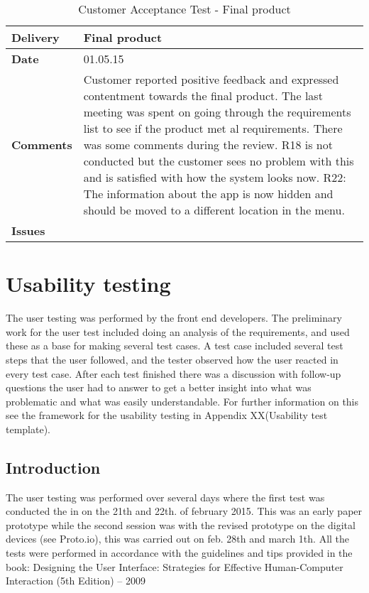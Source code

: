\begin{center}
\begin{longtable}{ | p{4cm} | p{13cm} | }
					
					
				\end{longtable}
			\end{center}
			
			\renewcommand{\arraystretch}{2}%
			\begin{center}
				\begin{longtable}{ | p{4cm} | p{13cm} | }
					
					\caption[Customer Acceptance Test - Final product]{Customer Acceptance Test - Final product} \label{Tab:cattest5}\\
					\hline
					\textbf{Delivery} & Final product\\ \hline
					\textbf{Date} & 01.05.15 \\ \hline
					\textbf{Comments} & Customer reported positive feedback and expressed contentment towards the final product.  The last meeting was spent on going through the requirements list to see if the product met al requirements. There was some comments during the review. 
					R18 is not conducted but the customer sees no problem with this and is satisfied with how the system looks now. 
					R22: The information about the app is now hidden and should be moved to a different location in the menu.   \\ \hline
					\textbf{Issues} \\ \hline
				\end{longtable}
			\end{center}
			
			\section{Usability testing}
			
			The user testing was performed by the front end developers. The preliminary work for the user test included doing an analysis of the requirements, and used these as a base for making several test cases. 
			A test case included several test steps that the user followed, and the tester observed how the user reacted in every test case. After each test finished there was a discussion with follow-up questions the user had to answer to get a better insight into what was problematic and what was easily understandable. For further information on this see the framework for the usability testing in Appendix XX(Usability test template).
			
			\subsection{Introduction}
			The user testing was performed over several days where the first test was conducted the in on the 21th and 22th. of february 2015. This was an early paper prototype while the second session was with the revised prototype on the digital devices (see Proto.io), this was carried out on feb. 28th and march 1th. All the tests were performed in accordance with the guidelines and tips provided in the book: Designing the User Interface: Strategies for Effective Human-Computer Interaction (5th Edition) – 2009
			
